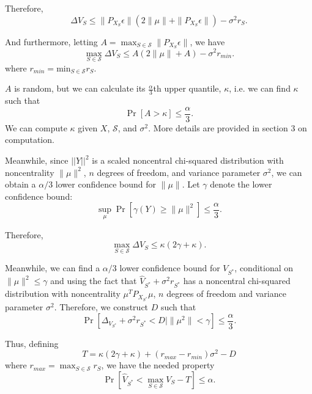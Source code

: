 \documentclass[12pt]{article}
\begin{document}
Therefore,
\[
\Delta V_S \leq \|P_{X_S} \epsilon\|(2 \|\mu\| + \|P_{X_S}\epsilon \|) - \sigma^2 r_S.
\]

And furthermore, letting $A = \max_{S \in \mathcal{S}} \|P_{X_S} \epsilon\|$,
we have
\[
\max_{S \in \mathcal{S}} \Delta V_S \leq A(2 \|\mu\| + A) - \sigma^2 r_{min}.
\]
where $r_{min} = \text{min}_{S \in \mathcal{S}} r_S$.

$A$ is random, but we can calculate its $\frac{\alpha}{3}$th upper quantile, $\kappa$, i.e. we can find $\kappa$ such that
\[
\Pr[A > \kappa] \leq \frac{\alpha}{3}.
\]
We can compute $\kappa$ given $X$, $\mathcal{S}$, and $\sigma^2$.  More details are provided in section 3 on computation.

Meanwhile, since $||Y||^2$ is a scaled noncentral chi-squared distribution with noncentrality $\|\mu\|^2$, $n$ degrees of freedom, and variance parameter $\sigma^2$, we can obtain a $\alpha/3$ lower confidence bound for $\|\mu\|$.  Let $\gamma$ denote the lower confidence bound:
\[
\sup_{\mu} \Pr[\gamma(Y) \geq \|\mu\|^2] \leq \frac{\alpha}{3}.
\]

Therefore,
\[
\max_{S \in \mathcal{S}} \Delta V_S \leq \kappa(2\gamma + \kappa).
\]

Meanwhile, we can find a $\alpha/3$ lower confidence bound for $V_{S^*}$, conditional on $\|\mu\|^2 \leq \gamma$ and using the fact that $\hat{V}_{S^*} + \sigma^2 r_{S^*}$ has a noncentral chi-squared distribution with noncentrality $\mu^T P_{X_{S^*}} \mu$, $n$ degrees of freedom and variance parameter $\sigma^2$.  Therefore, we construct $D$ such that
\[
\Pr[\Delta_{V_{S^*}} + \sigma^2 r_{S^*} < D| \|\mu^2\| < \gamma] \leq \frac{\alpha}{3}.
\]

Thus, defining
\[
T = \kappa(2\gamma + \kappa) + (r_{max}- r_{min}) \sigma^2 - D
\]
where $r_{max} = \max_{S \in \mathcal{S}} r_S$,
we have the needed property
\[
\Pr[\hat{V}_{S^*} < \max_{S \in \mathcal{S}} V_S - T] \leq \alpha.
\]
\end{document}
